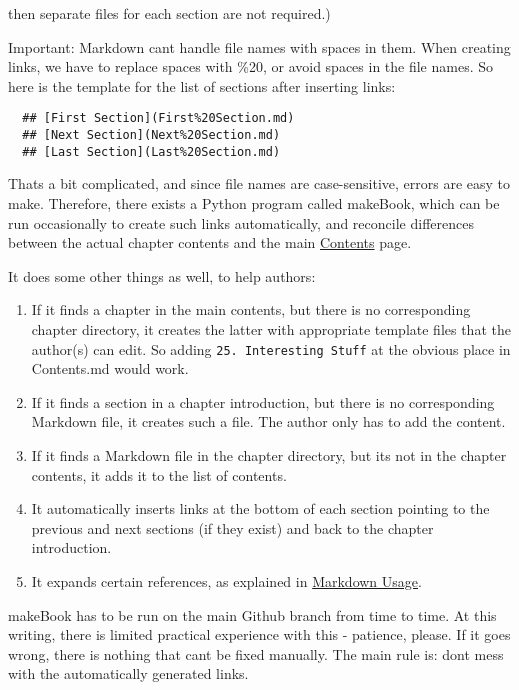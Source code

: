 \documentclass[
]{article}
\begin{document}
then separate files for each section are not required.)

Important: Markdown can\textquotesingle t handle file names with spaces
in them. When creating links, we have to replace spaces with \%20, or
avoid spaces in the file names. So here is the template for the list of
sections after inserting links:

\begin{verbatim}
  ## [First Section](First%20Section.md)
  ## [Next Section](Next%20Section.md)
  ## [Last Section](Last%20Section.md)
\end{verbatim}

That\textquotesingle s a bit complicated, and since file names are
case-sensitive, errors are easy to make. Therefore, there exists a
Python program called makeBook, which can be run occasionally to create
such links automatically, and reconcile differences between the actual
chapter contents and the main \hyperref[list-of-contents]{Contents}
page.

It does some other things as well, to help authors:

\begin{enumerate}
\def\labelenumi{\arabic{enumi}.}
\item
  If it finds a chapter in the main contents, but there is no
  corresponding chapter directory, it creates the latter with
  appropriate template files that the author(s) can edit. So adding
  \texttt{25.\ Interesting\ Stuff} at the obvious place in Contents.md
  would work.
\item
  If it finds a section in a chapter introduction, but there is no
  corresponding Markdown file, it creates such a file. The author only
  has to add the content.
\item
  If it finds a Markdown file in the chapter directory, but
  it\textquotesingle s not in the chapter contents, it adds it to the
  list of contents.
\item
  It automatically inserts links at the bottom of each section pointing
  to the previous and next sections (if they exist) and back to the
  chapter introduction.
\item
  It expands certain references, as explained in
  \hyperref[markdown-usage]{Markdown Usage}.
\end{enumerate}

makeBook has to be run on the main Github branch from time to time. At
this writing, there is limited practical experience with this -
patience, please. If it goes wrong, there is nothing that
can\textquotesingle t be fixed manually. The main rule is:
don\textquotesingle t mess with the automatically generated links.
\end{document}
